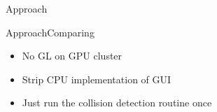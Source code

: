 \begin{frame}{Approach}{}
\end{frame}

\begin{frame}{Approach}{Comparing}
	\begin{itemize}
		\item No GL on GPU cluster
		\item Strip CPU implementation of GUI
		\item Just run the collision detection routine once
	\end{itemize}
\end{frame}

